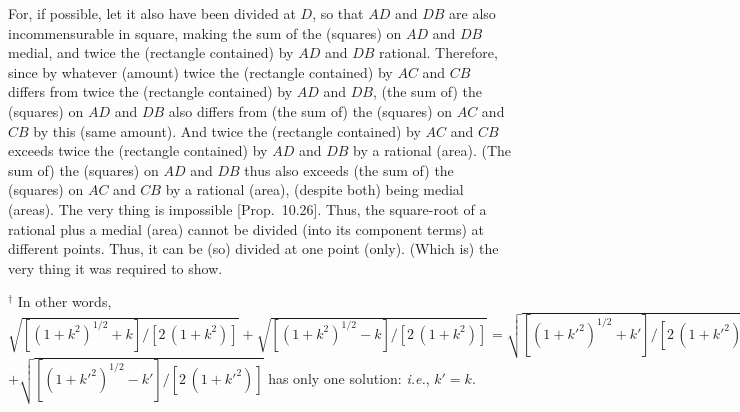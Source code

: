 \begin{Parallel}{}{}
{For, if possible, let it also have been divided at $D$, so that
$AD$ and $DB$ are also incommensurable in square, making the sum of 
the (squares) on $AD$ and $DB$ medial, and twice the (rectangle
contained) by $AD$ and $DB$ rational. Therefore, since by whatever
(amount) twice the (rectangle contained) by $AC$ and $CB$
differs from twice the (rectangle contained) by $AD$ and $DB$, (the sum of) the (squares) on  $AD$ and $DB$ also differs from (the sum of) the
(squares) on
$AC$ and $CB$ by this
(same amount). And twice the (rectangle contained) by $AC$ and $CB$
exceeds twice the (rectangle contained) by $AD$ and $DB$ by a
rational (area). (The sum of) the (squares)
on $AD$ and $DB$ thus also exceeds (the sum of) the (squares) on $AC$ and $CB$ by a rational (area),
(despite both) being medial (areas). The very thing is impossible [Prop.~10.26]. Thus, the square-root of a rational
plus a medial (area) cannot be divided (into its component terms) at different points. Thus, it
can  be (so) divided at one point (only). (Which is) the very thing it was required to
show.}
\end{Parallel}
{\footnotesize\noindent$^\dag$ In other words, $\sqrt{[(1+k^2)^{1/2}+k]/[2\,(1+k^2)]} +\sqrt{[(1+k^2)^{1/2}-k]/[2\,(1+k^2)]}=\sqrt{[(1+{k'}^2)^{1/2}+k']/[2\,(1+{k'}^2)]}$\\$ +\sqrt{[(1+{k'}^2)^{1/2}-k']/[2\,(1+{k'}^2)]}$
has only one solution: {\em i.e.}, $k'=k$.}

